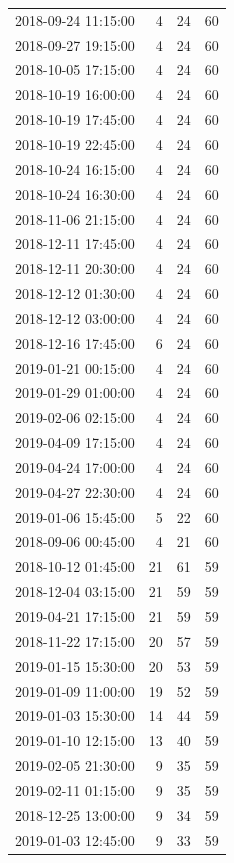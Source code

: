 \begin{tabular}{lrrr}
2018-09-24 11:15:00 & 4 & 24 & 60 \\
2018-09-27 19:15:00 & 4 & 24 & 60 \\
2018-10-05 17:15:00 & 4 & 24 & 60 \\
2018-10-19 16:00:00 & 4 & 24 & 60 \\
2018-10-19 17:45:00 & 4 & 24 & 60 \\
2018-10-19 22:45:00 & 4 & 24 & 60 \\
2018-10-24 16:15:00 & 4 & 24 & 60 \\
2018-10-24 16:30:00 & 4 & 24 & 60 \\
2018-11-06 21:15:00 & 4 & 24 & 60 \\
2018-12-11 17:45:00 & 4 & 24 & 60 \\
2018-12-11 20:30:00 & 4 & 24 & 60 \\
2018-12-12 01:30:00 & 4 & 24 & 60 \\
2018-12-12 03:00:00 & 4 & 24 & 60 \\
2018-12-16 17:45:00 & 6 & 24 & 60 \\
2019-01-21 00:15:00 & 4 & 24 & 60 \\
2019-01-29 01:00:00 & 4 & 24 & 60 \\
2019-02-06 02:15:00 & 4 & 24 & 60 \\
2019-04-09 17:15:00 & 4 & 24 & 60 \\
2019-04-24 17:00:00 & 4 & 24 & 60 \\
2019-04-27 22:30:00 & 4 & 24 & 60 \\
2019-01-06 15:45:00 & 5 & 22 & 60 \\
2018-09-06 00:45:00 & 4 & 21 & 60 \\
2018-10-12 01:45:00 & 21 & 61 & 59 \\
2018-12-04 03:15:00 & 21 & 59 & 59 \\
2019-04-21 17:15:00 & 21 & 59 & 59 \\
2018-11-22 17:15:00 & 20 & 57 & 59 \\
2019-01-15 15:30:00 & 20 & 53 & 59 \\
2019-01-09 11:00:00 & 19 & 52 & 59 \\
2019-01-03 15:30:00 & 14 & 44 & 59 \\
2019-01-10 12:15:00 & 13 & 40 & 59 \\
2019-02-05 21:30:00 & 9 & 35 & 59 \\
2019-02-11 01:15:00 & 9 & 35 & 59 \\
2018-12-25 13:00:00 & 9 & 34 & 59 \\
2019-01-03 12:45:00 & 9 & 33 & 59 \\

\end{tabular}
